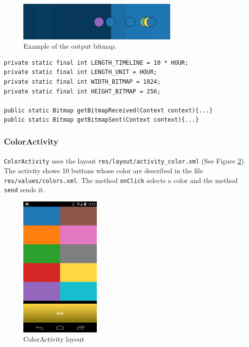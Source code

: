 \documentclass[12pt]{article}
\begin{document}
\begin{figure}[ht]
	\centering
		\includegraphics[width=8cm]{pictures/band.png}
	\caption{Example of the output bitmap.}
	\label{fig:band}
\end{figure}

\begin{verbatim}
private static final int LENGTH_TIMELINE = 10 * HOUR;
private static final int LENGTH_UNIT = HOUR;
private static final int WIDTH_BITMAP = 1024;
private static final int HEIGHT_BITMAP = 256;

public static Bitmap getBitmapReceived(Context context){...}
public static Bitmap getBitmapSent(Context context){...}
\end{verbatim}

\subsubsection{ColorActivity}
\paragraph{}\verb?ColorActivity? uses the layout \verb?res/layout/activity_color.xml? (See Figure \ref{fig:color}). The activity shows 10 buttons whose color are described in the file \verb?res/values/colors.xml?. The method \verb?onClick? selects a color and the method \verb?send? sends it.

\begin{figure}[ht]
	\centering
		\includegraphics[width=4cm]{pictures/color.png}
	\caption{ColorActivity layout}
	\label{fig:color}
\end{figure}
\end{document}
